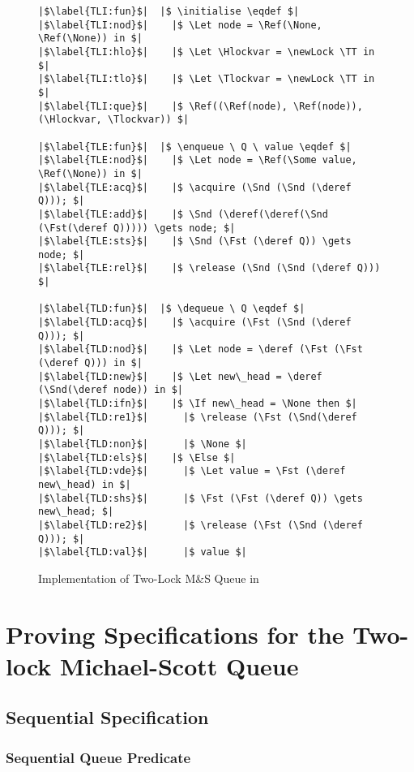 \documentclass[a4paper, 10pt]{report}
\theoremstyle{definition}
\newcommand{\newLock}{\operatorname{newLock}}
\newcommand{\acquire}{\operatorname{acquire}}
\newcommand{\release}{\operatorname{release}}
\newcommand{\initialise}{\operatorname{initialize}}
\newcommand{\enqueue}{\operatorname{enqueue}}
\newcommand{\dequeue}{\operatorname{dequeue}}
\newcommand{\msq}{M\&S Queue}
\newcommand{\tlmsq}{Two-Lock \msq{}}
\newcommand{\Hlockvar}{H\_lock}
\newcommand{\Tlockvar}{T\_lock}
\begin{document}
\begin{figure}
\begin{verbatim}
|$\label{TLI:fun}$|  |$ \initialise \eqdef $|
|$\label{TLI:nod}$|    |$ \Let node = \Ref(\None, \Ref(\None)) in $|
|$\label{TLI:hlo}$|    |$ \Let \Hlockvar = \newLock \TT in $|
|$\label{TLI:tlo}$|    |$ \Let \Tlockvar = \newLock \TT in $|
|$\label{TLI:que}$|    |$ \Ref((\Ref(node), \Ref(node)), (\Hlockvar, \Tlockvar)) $|

|$\label{TLE:fun}$|  |$ \enqueue \ Q \ value \eqdef $|
|$\label{TLE:nod}$|    |$ \Let node = \Ref(\Some value, \Ref(\None)) in $|
|$\label{TLE:acq}$|    |$ \acquire (\Snd (\Snd (\deref Q))); $|
|$\label{TLE:add}$|    |$ \Snd (\deref(\deref(\Snd (\Fst(\deref Q))))) \gets node; $|
|$\label{TLE:sts}$|    |$ \Snd (\Fst (\deref Q)) \gets node; $|
|$\label{TLE:rel}$|    |$ \release (\Snd (\Snd (\deref Q))) $|

|$\label{TLD:fun}$|  |$ \dequeue \ Q \eqdef $|
|$\label{TLD:acq}$|    |$ \acquire (\Fst (\Snd (\deref Q))); $|
|$\label{TLD:nod}$|    |$ \Let node = \deref (\Fst (\Fst (\deref Q))) in $|
|$\label{TLD:new}$|    |$ \Let new\_head = \deref (\Snd(\deref node)) in $|
|$\label{TLD:ifn}$|    |$ \If new\_head = \None then $|
|$\label{TLD:re1}$|      |$ \release (\Fst (\Snd(\deref Q))); $|
|$\label{TLD:non}$|      |$ \None $|
|$\label{TLD:els}$|    |$ \Else $|
|$\label{TLD:vde}$|      |$ \Let value = \Fst (\deref new\_head) in $|
|$\label{TLD:shs}$|      |$ \Fst (\Fst (\deref Q)) \gets new\_head; $|
|$\label{TLD:re2}$|      |$ \release (\Fst (\Snd (\deref Q))); $|
|$\label{TLD:val}$|      |$ value $|
\end{verbatim}
\caption{Implementation of \tlmsq{} in \heaplang}
\end{figure}

\chapter{Proving Specifications for the Two-lock Michael-Scott Queue}
\label{ch:TLMSQSPECS}

\section{Sequential Specification}
\label{TLMSQSEQ:section:sequential}

\subsection{Sequential Queue Predicate}
\label{TLMSQSEQ:sequential:sub:seq-queue-pred}
\end{document}
